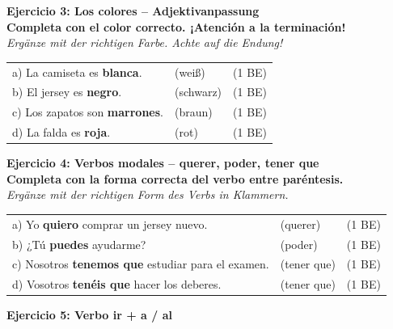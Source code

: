 \documentclass[11pt, a4paper]{article}
\newcommand{\punktebox}[1]{\hfill\fbox{\scriptsize \_\_/#1}}
\newcommand{\lsg}[1]{\textcolor{loesung}{\textbf{#1}}}
\newcommand{\aufgabe}[3]{%
    \textbf{\textcolor{spanisch}{Ejercicio #1: #2}} \punktebox{#3}\\[2pt]
}
\newcommand{\enunciado}[2]{%
    \textbf{#1}\\[1pt]
    {\small\textit{#2}}%
}
\begin{document}
\aufgabe{3}{Los colores -- Adjektivanpassung}{4}

\enunciado{Completa con el color correcto. ¡Atención a la terminación!}{Ergänze mit der richtigen Farbe. Achte auf die Endung!}

\vspace{6pt}

\begin{tabular}{@{}p{9cm}p{3cm}p{2cm}@{}}
a) La camiseta es \lsg{blanca}. & (weiß) & (1 BE) \\[8pt]
b) El jersey es \lsg{negro}. & (schwarz) & (1 BE) \\[8pt]
c) Los zapatos son \lsg{marrones}. & (braun) & (1 BE) \\[8pt]
d) La falda es \lsg{roja}. & (rot) & (1 BE) \\
\end{tabular}

\vspace{10pt}

\newpage


\aufgabe{4}{Verbos modales -- querer, poder, tener que}{4}

\enunciado{Completa con la forma correcta del verbo entre paréntesis.}{Ergänze mit der richtigen Form des Verbs in Klammern.}

\vspace{6pt}

\begin{tabular}{@{}p{10cm}p{3cm}p{2cm}@{}}
a) Yo \lsg{quiero} comprar un jersey nuevo. & (querer) & (1 BE) \\[8pt]
b) ¿Tú \lsg{puedes} ayudarme? & (poder) & (1 BE) \\[8pt]
c) Nosotros \lsg{tenemos que} estudiar para el examen. & (tener que) & (1 BE) \\[8pt]
d) Vosotros \lsg{tenéis que} hacer los deberes. & (tener que) & (1 BE) \\
\end{tabular}

\vspace{10pt}


\aufgabe{5}{Verbo ir + a / al}{4}
\end{document}

